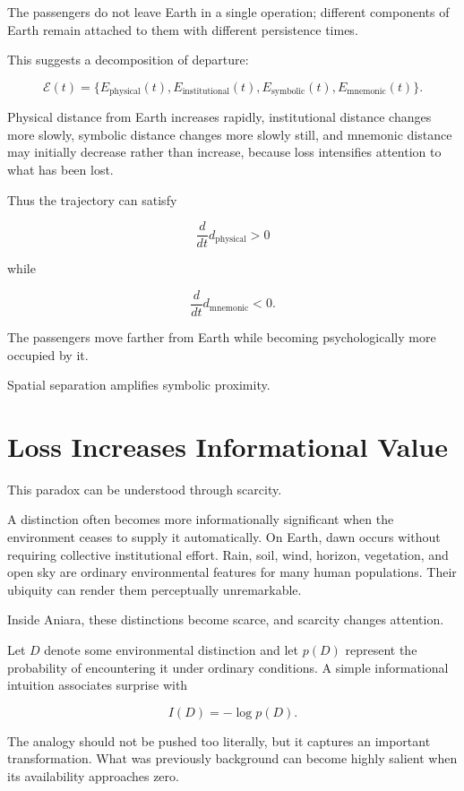 \documentclass[11pt,oneside]{book}
\theoremstyle{definition}
\theoremstyle{remark}
\begin{document}
The passengers do not leave Earth in a single operation; different components of Earth remain attached to them with different persistence times.

This suggests a decomposition of departure:

\[
\mathcal E(t)
=
\{
E_{\mathrm{physical}}(t),
E_{\mathrm{institutional}}(t),
E_{\mathrm{symbolic}}(t),
E_{\mathrm{mnemonic}}(t)
\}.
\]

Physical distance from Earth increases rapidly, institutional distance changes more slowly, symbolic distance changes more slowly still, and mnemonic distance may initially decrease rather than increase, because loss intensifies attention to what has been lost.

Thus the trajectory can satisfy

\[
\frac{d}{dt}d_{\mathrm{physical}}>0
\]

while

\[
\frac{d}{dt}d_{\mathrm{mnemonic}}<0.
\]

The passengers move farther from Earth while becoming psychologically more occupied by it.

Spatial separation amplifies symbolic proximity.

\section{Loss Increases Informational Value}

This paradox can be understood through scarcity.

A distinction often becomes more informationally significant when the environment ceases to supply it automatically. On Earth, dawn occurs without requiring collective institutional effort. Rain, soil, wind, horizon, vegetation, and open sky are ordinary environmental features for many human populations. Their ubiquity can render them perceptually unremarkable.

Inside Aniara, these distinctions become scarce, and scarcity changes attention.

Let \(D\) denote some environmental distinction and let \(p(D)\) represent the probability of encountering it under ordinary conditions. A simple informational intuition associates surprise with

\[
I(D)=-\log p(D).
\]

The analogy should not be pushed too literally, but it captures an important transformation. What was previously background can become highly salient when its availability approaches zero.
\end{document}
